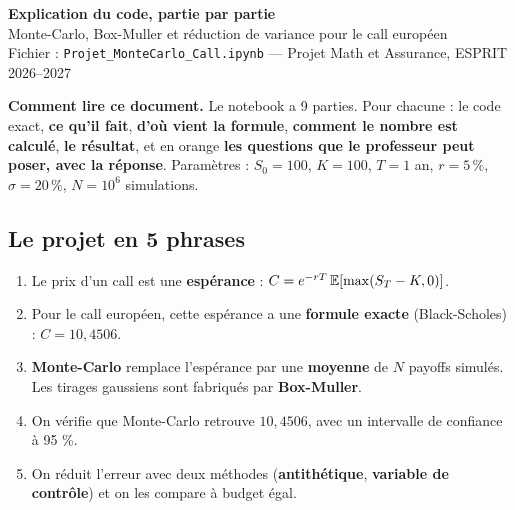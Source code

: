 \documentclass[11pt,a4paper]{article}
\begin{document}
\begin{center}
{\LARGE\bfseries\color{bleu} Explication du code, partie par partie}\\[4pt]
{\large Monte-Carlo, Box-Muller et réduction de variance pour le call européen}\\[2pt]
{\small Fichier : \texttt{Projet\_MonteCarlo\_Call.ipynb} — Projet Math et Assurance, ESPRIT 2026–2027}
\end{center}

\begin{tcolorbox}[colback=gris,colframe=bleu!50,boxrule=0.4pt]
\small\textbf{Comment lire ce document.} Le notebook a 9 parties. Pour chacune : le code exact, \textbf{ce qu'il fait}, \textbf{d'où vient la formule}, \textbf{comment le nombre est calculé}, \textbf{le résultat}, et en orange \textbf{les questions que le professeur peut poser, avec la réponse}.
Paramètres : $S_0 = 100$, $K = 100$, $T = 1$ an, $r = 5\,\%$, $\sigma = 20\,\%$, $N = 10^6$ simulations.
\end{tcolorbox}

\subsection*{Le projet en 5 phrases}
\begin{enumerate}[nosep]
\item Le prix d'un call est une \textbf{espérance} : $C = e^{-rT}\,\mathbb{E}[\max(S_T-K,0)]$.
\item Pour le call européen, cette espérance a une \textbf{formule exacte} (Black-Scholes) : $C = 10{,}4506$.
\item \textbf{Monte-Carlo} remplace l'espérance par une \textbf{moyenne} de $N$ payoffs simulés. Les tirages gaussiens sont fabriqués par \textbf{Box-Muller}.
\item On vérifie que Monte-Carlo retrouve $10{,}4506$, avec un intervalle de confiance à 95 \%.
\item On réduit l'erreur avec deux méthodes (\textbf{antithétique}, \textbf{variable de contrôle}) et on les compare à budget égal.
\end{enumerate}

\tableofcontents
\end{document}

